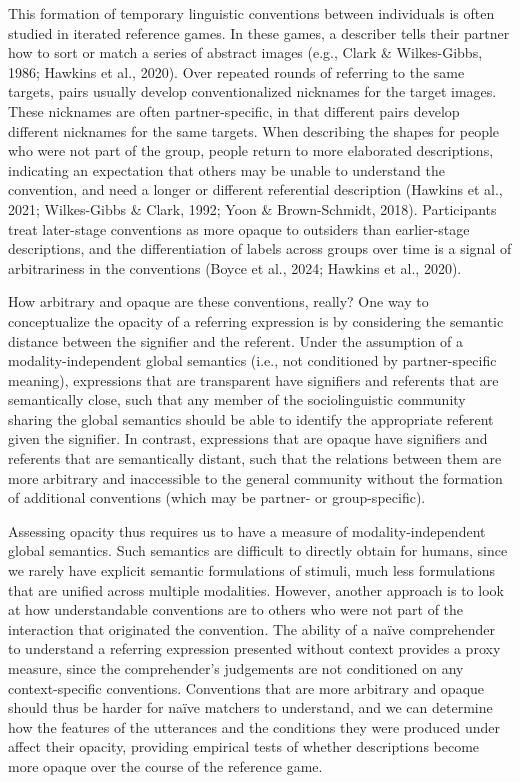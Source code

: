 \documentclass[10pt, letterpaper]{article}
\begin{document}
This formation of temporary linguistic conventions between individuals
is often studied in iterated reference games. In these games, a
describer tells their partner how to sort or match a series of abstract
images (e.g., Clark \& Wilkes-Gibbs, 1986; Hawkins et al., 2020). Over
repeated rounds of referring to the same targets, pairs usually develop
conventionalized nicknames for the target images. These nicknames are
often partner-specific, in that different pairs develop different
nicknames for the same targets. When describing the shapes for people
who were not part of the group, people return to more elaborated
descriptions, indicating an expectation that others may be unable to
understand the convention, and need a longer or different referential
description (Hawkins et al., 2021; Wilkes-Gibbs \& Clark, 1992; Yoon \&
Brown-Schmidt, 2018). Participants treat later-stage conventions as more
opaque to outsiders than earlier-stage descriptions, and the
differentiation of labels across groups over time is a signal of
arbitrariness in the conventions (Boyce et al., 2024; Hawkins et al.,
2020).

How arbitrary and opaque are these conventions, really? One way to
conceptualize the opacity of a referring expression is by considering
the semantic distance between the signifier and the referent. Under the
assumption of a modality-independent global semantics (i.e., not
conditioned by partner-specific meaning), expressions that are
transparent have signifiers and referents that are semantically close,
such that any member of the sociolinguistic community sharing the global
semantics should be able to identify the appropriate referent given the
signifier. In contrast, expressions that are opaque have signifiers and
referents that are semantically distant, such that the relations between
them are more arbitrary and inaccessible to the general community
without the formation of additional conventions (which may be partner-
or group-specific).

Assessing opacity thus requires us to have a measure of
modality-independent global semantics. Such semantics are difficult to
directly obtain for humans, since we rarely have explicit semantic
formulations of stimuli, much less formulations that are unified across
multiple modalities. However, another approach is to look at how
understandable conventions are to others who were not part of the
interaction that originated the convention. The ability of a naïve
comprehender to understand a referring expression presented without
context provides a proxy measure, since the comprehender's judgements
are not conditioned on any context-specific conventions. Conventions
that are more arbitrary and opaque should thus be harder for naïve
matchers to understand, and we can determine how the features of the
utterances and the conditions they were produced under affect their
opacity, providing empirical tests of whether descriptions become more
opaque over the course of the reference game.
\end{document}
